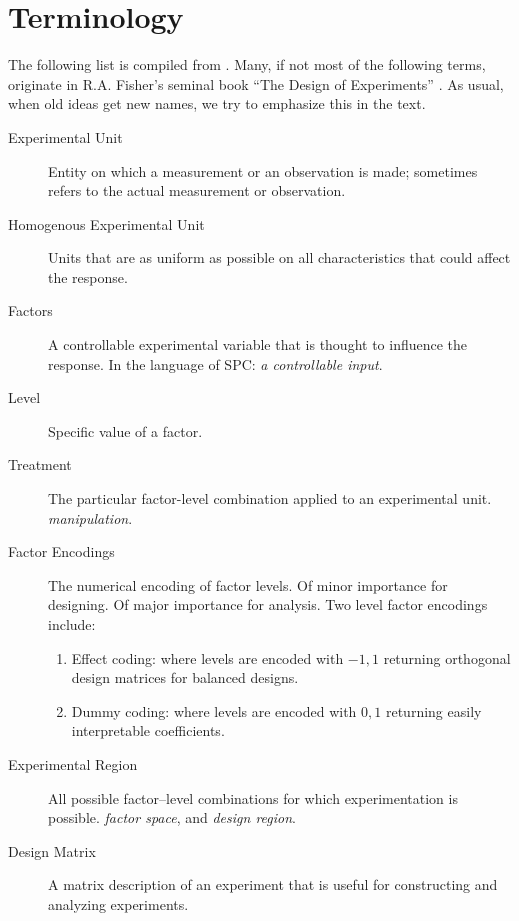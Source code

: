 \section{Terminology}
The following list is compiled from \cite{mason_statistical_2003}. Many, if not most of the following terms, originate in R.A. Fisher's seminal book ``The Design of Experiments'' \citep{fisher_design_1960}. As usual, when old ideas get new names, we try to emphasize this in the text.



\begin{description}

\item [Experimental Unit]  Entity on which a measurement or an observation is made;
sometimes refers to the actual measurement or observation.
\item [Homogenous Experimental Unit] Units that are as uniform as possible on all characteristics that could affect the response.

\item [Factors]  A controllable experimental variable that is thought to influence the response. In the language of SPC: \emph{a controllable input}.

\item [Level] Specific value of a factor.

\item[Treatment] The particular factor-level combination applied to an experimental unit. \Aka \emph{manipulation}.

\item [Factor Encodings] The numerical encoding of factor levels.
Of minor importance for designing. Of major importance for analysis.
Two level factor encodings include:
\begin{enumerate}
\item Effect coding: where levels are encoded with $-1,1$ returning orthogonal design matrices for balanced designs.
\item Dummy coding: where levels are encoded with $0,1$ returning easily interpretable coefficients.
\end{enumerate}

\item [Experimental Region] All possible factor–level combinations for which experimentation is possible. \Aka \emph{factor space}, and \emph{design region}.

\item [Design Matrix] A matrix description of an experiment that is useful for constructing and analyzing experiments.


\end{description}
